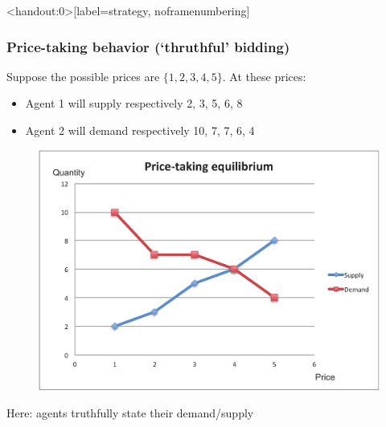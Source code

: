 \documentclass[english,10pt]{beamer}
\theoremstyle{definition}
\begin{document}
\begin{frame}<handout:0>[label=strategy, noframenumbering]
	\frametitle{Price-taking behavior (`thruthful' bidding)}
	Suppose the possible prices are $\{1,2,3,4,5\}$. At these prices:
	\begin{itemize}
	\item Agent 1 will supply respectively 2, 3, 5, 6, 8
	\item Agent 2 will demand respectively 10, 7, 7, 6, 4
	\end{itemize}
	\begin{figure}
	\includegraphics[width=.4\paperwidth]{pics/Image_PriceTaking2}
	\end{figure}
	Here: agents truthfully state their demand/supply
\end{frame}
\end{document}
